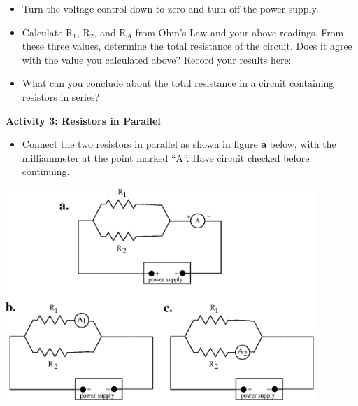 \begin{itemize}
\item Turn the voltage control down to zero and turn off the power supply.

\item Calculate R\( _{1} \), R\( _{2} \), and R\( _{A} \) from Ohm's Law and 
your above readings. From these three values, determine the total resistance of 
the circuit. Does it agree with the value you calculated above? Record your 
results here:
\vspace{20mm}

\item What can you conclude about the total resistance in a circuit 
containing resistors in series?\vspace{15mm}

\end{itemize}

\pagebreak

\textbf{Activity 3: Resistors in Parallel}

\begin{itemize}
\item Connect the two resistors in parallel as shown in figure \textbf{a} 
below, with the milliammeter at the point marked ``A''. Have circuit checked 
before continuing.
\end{itemize}
\vspace{0.3cm}
\begin{center}
\includegraphics[width=4.6in]{ohms_law_fig_2b.eps}
\end{center}
\vspace{0.3cm}

